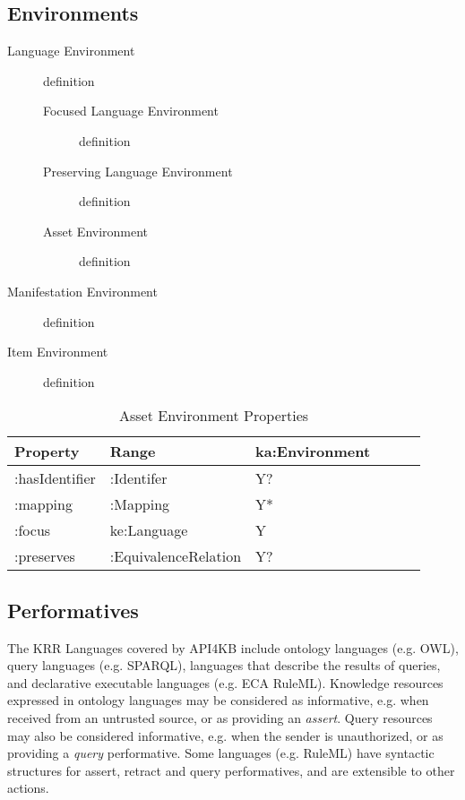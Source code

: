 \documentclass[runningheads]{llncs}
\begin{document}
\subsection{Environments}
\begin{description}
\item[Language Environment] definition
\begin{description}
\item[Focused Language Environment] definition
\item[Preserving Language Environment] definition
\item[Asset Environment] definition
\end{description}
\item[Manifestation Environment] definition
\item[Item Environment] definition
\end{description}

\begin{table}[h]
\centering
\begin{tabular}{|l|l|l|l|l|l|}
 \hline
\textbf{Property} & \textbf{Range} & \textbf{ka:Environment}   \\ \hline
:hasIdentifier    & :Identifer     &  Y?                       \\ \hline
:mapping          & :Mapping       &  Y*                       \\ \hline
:focus            & ke:Language    &  Y                       \\ \hline
:preserves        & :EquivalenceRelation    &  Y?              \\ \hline

\end{tabular}
\caption{Asset Environment Properties}
\label{krenvironment}
\end{table}

\subsection{Performatives}
The KRR Languages covered by API4KB include ontology languages (e.g. OWL), query languages (e.g. SPARQL), languages that describe the results of queries, and declarative executable languages (e.g. ECA RuleML). Knowledge resources expressed in ontology languages may be considered as informative, e.g. when received from an untrusted source, or as providing an \emph{assert}. Query resources may also be considered informative, e.g. when the sender is unauthorized, or as providing a \emph{query} performative. Some languages (e.g. RuleML) have syntactic structures for assert, retract and query performatives, and are extensible to other actions.
\end{document}

